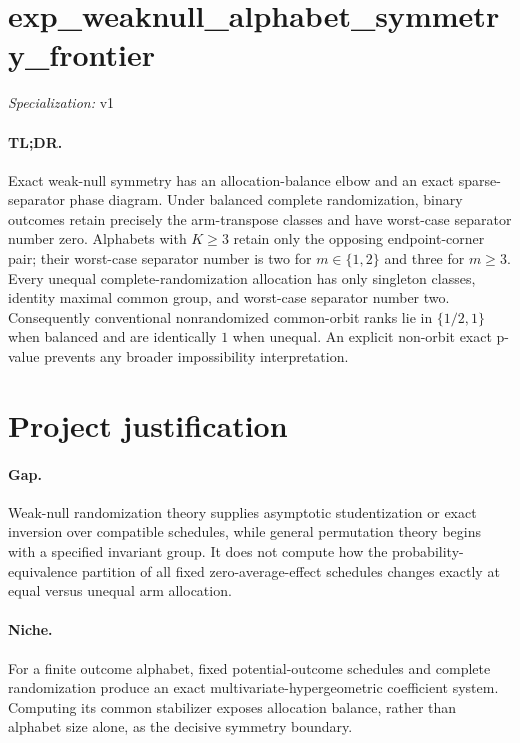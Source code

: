 \documentclass{article}
\begin{document}
\sloppy

\section*{exp\_\allowbreak{}weaknull\_\allowbreak{}alphabet\_\allowbreak{}symmetry\_\allowbreak{}frontier}

\noindent\textit{Specialization:} v1\par

\paragraph{TL;DR.} Exact weak-null symmetry has an allocation-balance elbow and an exact sparse-separator phase diagram. Under balanced complete randomization, binary outcomes retain precisely the arm-transpose classes and have worst-case separator number zero. Alphabets with \(K\geq3\) retain only the opposing endpoint-corner pair; their worst-case separator number is two for \(m\in\{1,2\}\) and three for \(m\geq3\). Every unequal complete-randomization allocation has only singleton classes, identity maximal common group, and worst-case separator number two. Consequently conventional nonrandomized common-orbit ranks lie in \(\{1/2,1\}\) when balanced and are identically \(1\) when unequal. An explicit non-orbit exact p-value prevents any broader impossibility interpretation.

\section{Project justification}

\paragraph{Gap.} Weak-null randomization theory supplies asymptotic studentization or exact inversion over compatible schedules, while general permutation theory begins with a specified invariant group. It does not compute how the probability-equivalence partition of all fixed zero-average-effect schedules changes exactly at equal versus unequal arm allocation.

\paragraph{Niche.} For a finite outcome alphabet, fixed potential-outcome schedules and complete randomization produce an exact multivariate-hypergeometric coefficient system. Computing its common stabilizer exposes allocation balance, rather than alphabet size alone, as the decisive symmetry boundary.
\end{document}
